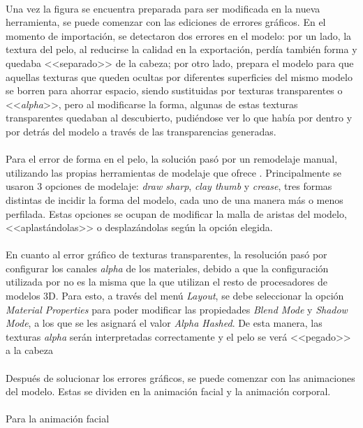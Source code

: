 \documentclass{subfiles}
\begin{document}
    \paragraph{}
    Una vez la figura se encuentra preparada para ser modificada en la nueva herramienta, se puede comenzar con las ediciones de errores gráficos. En el momento de importación, se detectaron dos errores en el modelo: por un lado, la textura del pelo, al reducirse la calidad en la exportación, perdía también forma y quedaba <<separado>> de la cabeza; por otro lado, \makehuman prepara el modelo para que aquellas texturas que queden ocultas por diferentes superficies del mismo modelo se borren para ahorrar espacio, siendo sustituidas por texturas transparentes o <<\textit{alpha}>>, pero al modificarse la forma, algunas de estas texturas transparentes quedaban al descubierto, pudiéndose ver lo que había por dentro y por detrás del modelo a través de las transparencias generadas.

    \paragraph{}
    Para el error de forma en el pelo, la solución pasó por un remodelaje manual, utilizando las propias herramientas de modelaje que ofrece \blender. Principalmente se usaron 3 opciones de modelaje: \textit{draw sharp}, \textit{clay thumb} y \textit{crease}, tres formas distintas de incidir la forma del modelo, cada uno de una manera más o menos perfilada. Estas opciones se ocupan de modificar la malla de aristas del modelo, <<aplastándolas>> o desplazándolas según la opción elegida.

    \paragraph{}
    En cuanto al error gráfico de texturas transparentes, la resolución pasó por configurar los canales \textit{alpha} de los materiales, debido a que la configuración utilizada por \makehuman no es la misma que la que utilizan el resto de procesadores de modelos 3D. Para esto, a través del menú \textit{Layout}, se debe seleccionar la opción \textit{Material Properties} para poder modificar las propiedades \textit{Blend Mode} y \textit{Shadow Mode}, a los que se les asignará el valor \textit{Alpha Hashed}. De esta manera, las texturas \textit{alpha} serán interpretadas correctamente y el pelo se verá <<pegado>> a la cabeza

    \paragraph{}
    Después de solucionar los errores gráficos, se puede comenzar con las animaciones del modelo. Estas se dividen en la animación facial y la animación corporal.

    \paragraph{}
    Para la animación facial
\end{document}
